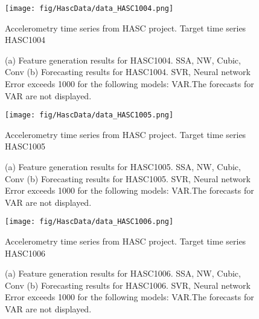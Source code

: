 \documentclass[12pt]{article}
\begin{document}
\begin{figure}
\centering
\texttt{[image: fig/HascData/data\_HASC1004.png]}
\caption{Accelerometry time series from HASC project. Target time series	HASC1004	}
\end{figure}


\begin{figure}
\centering
{}
\caption{(a)	Feature generation results for	HASC1004.	SSA, NW, Cubic, Conv	(b)	Forecasting results for	HASC1004.	SVR, Neural network	Error exceeds 1000 for the following models: VAR.The forecasts for VAR are not displayed.	}
\end{figure}


\begin{figure}
\centering
\texttt{[image: fig/HascData/data\_HASC1005.png]}
\caption{Accelerometry time series from HASC project. Target time series	HASC1005	}
\end{figure}


\begin{figure}
\centering
{}
\caption{(a)	Feature generation results for	HASC1005.	SSA, NW, Cubic, Conv	(b)	Forecasting results for	HASC1005.	SVR, Neural network	Error exceeds 1000 for the following models: VAR.The forecasts for VAR are not displayed.	}
\end{figure}


\begin{figure}
\centering
\texttt{[image: fig/HascData/data\_HASC1006.png]}
\caption{Accelerometry time series from HASC project. Target time series	HASC1006	}
\end{figure}


\begin{figure}
\centering
{}
\caption{(a)	Feature generation results for	HASC1006.	SSA, NW, Cubic, Conv	(b)	Forecasting results for	HASC1006.	SVR, Neural network	Error exceeds 1000 for the following models: VAR.The forecasts for VAR are not displayed.	}
\end{figure}
\end{document}
